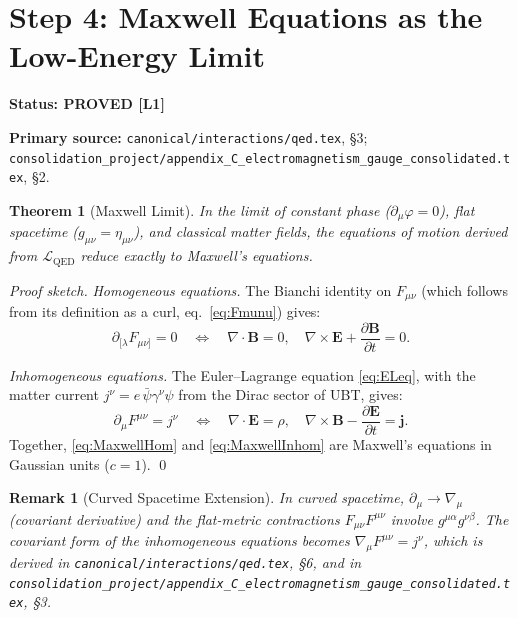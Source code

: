 \documentclass[11pt,a4paper]{article}
\newtheorem{theorem}{Theorem}
\newtheorem{remark}{Remark}
\newcommand{\Lone}{\textbf{[L1]}}
\newcommand{\PROVED}{\textbf{PROVED}}
\begin{document}
\section{Step 4: Maxwell Equations as the Low-Energy Limit}

\noindent\textbf{Status: \PROVED{} \Lone}

\noindent\textbf{Primary source:}
\texttt{canonical/interactions/qed.tex}, \S3;
\texttt{consolidation\_project/appendix\_C\_electromagnetism\_gauge\_consolidated.tex}, \S2.

\medskip

\begin{theorem}[Maxwell Limit]
In the limit of constant phase ($\partial_\mu\varphi = 0$), flat spacetime
($g_{\mu\nu} = \eta_{\mu\nu}$), and classical matter fields, the equations of
motion derived from $\mathcal{L}_{\mathrm{QED}}$ reduce exactly to Maxwell's
equations.
\end{theorem}

\begin{proof}[Proof sketch]
\emph{Homogeneous equations.}
The Bianchi identity on $F_{\mu\nu}$ (which follows from its definition as a
curl, eq.\ \eqref{eq:Fmunu}) gives:
\begin{equation}\label{eq:MaxwellHom}
  \partial_{[\lambda}F_{\mu\nu]} = 0
  \quad \Longleftrightarrow \quad
  \nabla\cdot\mathbf{B} = 0,\quad
  \nabla\times\mathbf{E} + \frac{\partial\mathbf{B}}{\partial t} = 0.
\end{equation}

\emph{Inhomogeneous equations.}
The Euler--Lagrange equation \eqref{eq:ELeq}, with the matter current
$j^\nu = e\,\bar\psi\gamma^\nu\psi$ from the Dirac sector of UBT, gives:
\begin{equation}\label{eq:MaxwellInhom}
  \partial_\mu F^{\mu\nu} = j^\nu
  \quad \Longleftrightarrow \quad
  \nabla\cdot\mathbf{E} = \rho,\quad
  \nabla\times\mathbf{B} - \frac{\partial\mathbf{E}}{\partial t} = \mathbf{j}.
\end{equation}
Together, \eqref{eq:MaxwellHom} and \eqref{eq:MaxwellInhom} are Maxwell's
equations in Gaussian units ($c=1$). \qed
\end{proof}

\begin{remark}[Curved Spacetime Extension]
In curved spacetime, $\partial_\mu \to \nabla_\mu$ (covariant derivative) and
the flat-metric contractions $F_{\mu\nu}F^{\mu\nu}$ involve $g^{\mu\alpha}g^{\nu\beta}$.
The covariant form of the inhomogeneous equations becomes
$\nabla_\mu F^{\mu\nu} = j^\nu$, which is derived in
\texttt{canonical/interactions/qed.tex}, \S6, and in
\texttt{consolidation\_project/appendix\_C\_electromagnetism\_gauge\_consolidated.tex}, \S3.
\end{remark}
\end{document}
